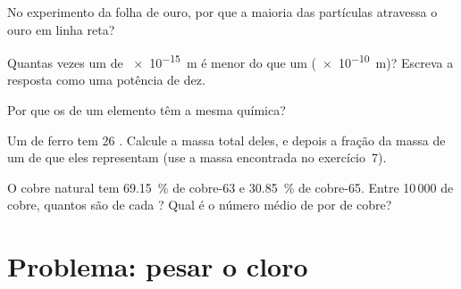 \begin{exercise}[$\star\star$]\label{exo:g9:inside-the-atom:8}
No experimento da folha de ouro, por que a maioria das partículas
atravessa o ouro em linha reta?
\end{exercise}

\begin{exercise}[$\star\star$]\label{exo:g9:inside-the-atom:9}
Quantas vezes um  de \qty{e-15}{m} é menor do que um 
(\qty{e-10}{m})? Escreva a resposta como uma potência de dez.
\end{exercise}

\begin{exercise}[$\star\star$]\label{exo:g9:inside-the-atom:10}
Por que os  de um elemento têm a mesma química?
\end{exercise}

\begin{exercise}[$\star\star\star$]\label{exo:g9:inside-the-atom:11}
Um  de ferro tem 26 . Calcule a massa total deles, e depois
a fração da massa de um  de  que eles representam
(use a massa encontrada no exercício~7).
\end{exercise}

\begin{exercise}[$\star\star\star$]\label{exo:g9:inside-the-atom:12}
O cobre natural tem \qty{69.15}{\percent} de cobre-63 e
\qty{30.85}{\percent} de cobre-65. Entre 10\,000  de cobre,
quantos são de cada ? Qual é o número médio de  por
 de cobre?
\end{exercise}

\clearpage %
\section{Problema: pesar o cloro}

